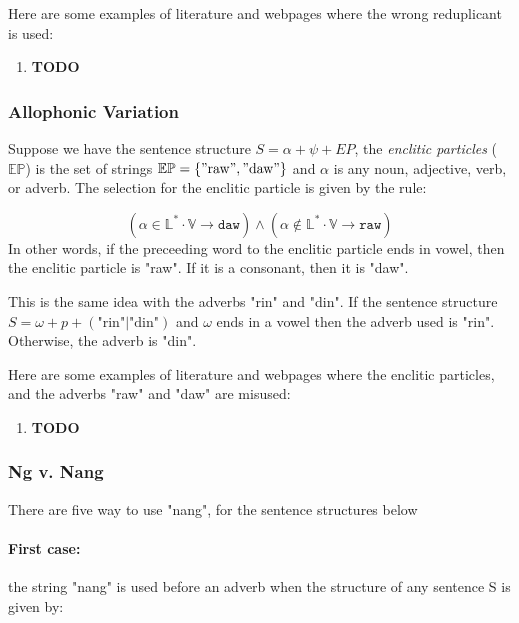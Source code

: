\begin{example}
    Here are some examples of literature and webpages where the wrong reduplicant is
    used:
\end{example}
\begin{enumerate}
    \item \textbf{TODO}
\end{enumerate}

\subsubsection{Allophonic Variation}

Suppose we have the sentence structure \(S = \alpha + \psi + EP\), the \textit{enclitic particles}
(\(\mathbb{EP}\)) is the set of strings \(\mathbb{EP} = \{"\text{raw}", "\text{daw}"\}\) and
\(\alpha\) is any noun, adjective, verb, or adverb. The selection for the enclitic particle
is given by the rule:

\[    \left( \alpha \in \mathbb{L}^* \cdot \mathbb{V}  \rightarrow \texttt{daw} \right) \wedge
    \left( \alpha \notin \mathbb{L}^* \cdot \mathbb{V}  \rightarrow \texttt{raw} \right)
\]
In other words, if the preceeding word to the enclitic particle ends in vowel,
then the enclitic particle is "raw". If it is a consonant, then it is "daw".

This is the same idea with the adverbs "rin" and "din". If the sentence structure
\(S = \omega + p + (\text{"rin"}|\text{"din"})\) and \(\omega\) ends in a vowel
then the adverb used is "rin". Otherwise, the adverb is "din".

Here are some examples of literature and webpages where the enclitic particles,
and the adverbs "raw" and "daw" are misused:
\begin{enumerate}
    \item \textbf{TODO}
\end{enumerate}

\subsubsection{Ng v. Nang}

There are five way to use "nang", for the sentence structures below

\paragraph{First case:} the string "nang" is used before an adverb when the
structure of any sentence S is given by:


